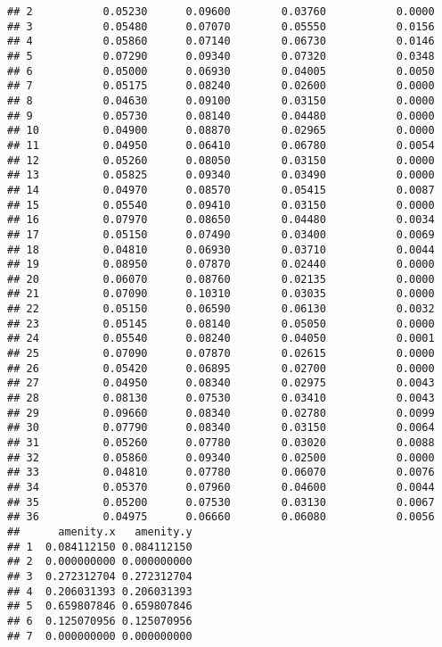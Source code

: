 \documentclass[]{article}
\begin{document}
\begin{verbatim}
## 2           0.05230      0.09600        0.03760           0.0000
## 3           0.05480      0.07070        0.05550           0.0156
## 4           0.05860      0.07140        0.06730           0.0146
## 5           0.07290      0.09340        0.07320           0.0348
## 6           0.05000      0.06930        0.04005           0.0050
## 7           0.05175      0.08240        0.02600           0.0000
## 8           0.04630      0.09100        0.03150           0.0000
## 9           0.05730      0.08140        0.04480           0.0000
## 10          0.04900      0.08870        0.02965           0.0000
## 11          0.04950      0.06410        0.06780           0.0054
## 12          0.05260      0.08050        0.03150           0.0000
## 13          0.05825      0.09340        0.03490           0.0000
## 14          0.04970      0.08570        0.05415           0.0087
## 15          0.05540      0.09410        0.03150           0.0000
## 16          0.07970      0.08650        0.04480           0.0034
## 17          0.05150      0.07490        0.03400           0.0069
## 18          0.04810      0.06930        0.03710           0.0044
## 19          0.08950      0.07870        0.02440           0.0000
## 20          0.06070      0.08760        0.02135           0.0000
## 21          0.07090      0.10310        0.03035           0.0000
## 22          0.05150      0.06590        0.06130           0.0032
## 23          0.05145      0.08140        0.05050           0.0000
## 24          0.05540      0.08240        0.04050           0.0001
## 25          0.07090      0.07870        0.02615           0.0000
## 26          0.05420      0.06895        0.02700           0.0000
## 27          0.04950      0.08340        0.02975           0.0043
## 28          0.08130      0.07530        0.03410           0.0043
## 29          0.09660      0.08340        0.02780           0.0099
## 30          0.07790      0.08340        0.03150           0.0064
## 31          0.05260      0.07780        0.03020           0.0088
## 32          0.05860      0.09340        0.02500           0.0000
## 33          0.04810      0.07780        0.06070           0.0076
## 34          0.05370      0.07960        0.04600           0.0044
## 35          0.05200      0.07530        0.03130           0.0067
## 36          0.04975      0.06660        0.06080           0.0056
##      amenity.x   amenity.y
## 1  0.084112150 0.084112150
## 2  0.000000000 0.000000000
## 3  0.272312704 0.272312704
## 4  0.206031393 0.206031393
## 5  0.659807846 0.659807846
## 6  0.125070956 0.125070956
## 7  0.000000000 0.000000000

\end{verbatim}
\end{document}
